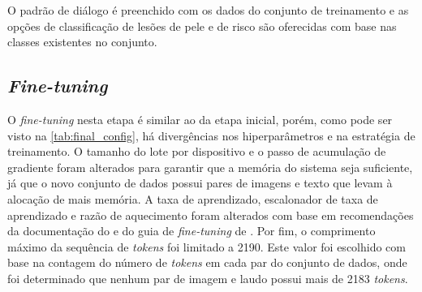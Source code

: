 O padrão de diálogo é preenchido com os dados do conjunto de treinamento e as opções de classificação de lesões de pele
e de risco são oferecidas com base nas classes existentes no conjunto.

\subsection{\textit{Fine-tuning}}

O \textit{fine-tuning} nesta etapa é similar ao da etapa inicial, porém, como pode ser visto na
\autoref{tab:final_config}, há divergências nos hiperparâmetros e na estratégia de treinamento. O tamanho do lote por
dispositivo e o passo de acumulação de gradiente foram alterados para garantir que a memória do sistema seja
suficiente, já que o novo conjunto de dados possui pares de imagens e texto que levam à alocação de mais memória. A
taxa de aprendizado, escalonador de taxa de aprendizado e razão de aquecimento foram alterados com base em
recomendações da documentação do \textcite{unsloth2025lora} e do guia de \textit{fine-tuning} de
\textcite{parthasarathy2024ultimate}. Por fim, o comprimento máximo da sequência de \textit{tokens} foi limitado a
2190. Este valor foi escolhido com base na contagem do número de \textit{tokens} em cada par do conjunto de
dados, onde foi determinado que nenhum par de imagem e laudo possui mais de 2183 \textit{tokens}.

